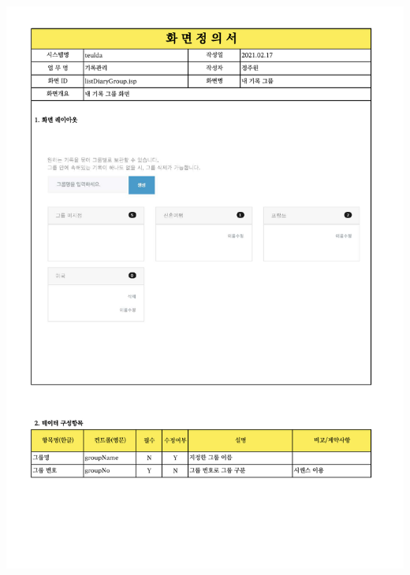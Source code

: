 {{{{{{{{{{{{{{{{{{{{{{{{{{{{{{{{{{{\includegraphics[width=20cm]{./Figure/Design/Display/diary/diary_17.pdf} \\
}}}}}}}}}}}}}}}}}}}}}}}}}}}}}}}}}}}
